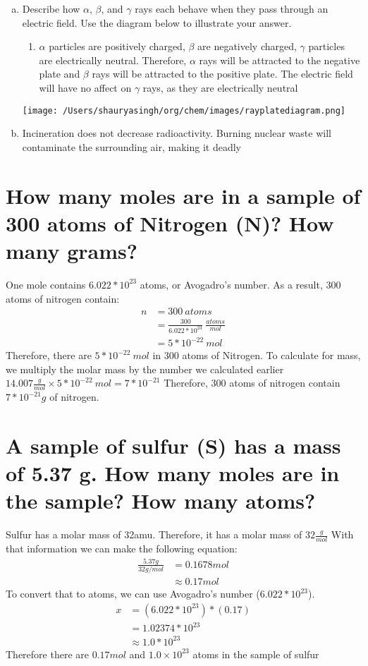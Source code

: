 \documentclass[11pt]{article}
\begin{document}
\begin{enumerate}[(a)]
\item Describe how \(\alpha\), \(\beta\), and \(\gamma\) rays each behave when they pass through an
electric field. Use the diagram below to illustrate your answer.
\begin{enumerate}
\item \(\alpha\) particles are positively charged, \(\beta\) are negatively charged, \(\gamma\)
particles are electrically neutral. Therefore, \(\alpha\) rays will be
attracted to the negative plate and \(\beta\) rays will be attracted to the
positive plate. The electric field will have no affect on \(\gamma\) rays, as
they are electrically neutral
\end{enumerate}
\begin{center}
\texttt{[image: /Users/shauryasingh/org/chem/images/rayplatediagram.png]}
\end{center}

\item Incineration does not decrease radioactivity. Burning nuclear waste will
contaminate the surrounding air, making it deadly
\end{enumerate}

\section{How many moles are in a sample of 300 atoms of Nitrogen (N)? How many grams?}
\label{sec:org99de753}
One mole contains \(6.022 *10^{23}\) atoms, or Avogadro's number. As a result, 300 atoms of nitrogen contain:
\begin{align*}
n&=300\ atoms\\
&=\frac{300}{6.022*10^{23}}\ \frac{atoms}{mol}\\
&=5*10^{-22}\ mol
\end{align*}
Therefore, there are \(5*10^{-22}\ mol\) in 300 atoms of Nitrogen. To calculate
for mass, we multiply the molar mass by the number we calculated earlier
\(14.007 \frac{g}{mol}\times5*10^{-22}\ mol=7*10^{-21}\)
Therefore, 300 atoms of nitrogen contain \(7*10^{-21}g\) of nitrogen.

\section{A sample of sulfur (S) has a mass of 5.37 g. How many moles are in the sample? How many atoms?}
\label{sec:org65d995b}
Sulfur has a molar mass of 32amu. Therefore, it has a molar mass of
\(32\frac{g}{mol}\)
With that information we can make the following equation:
\begin{align*}
\frac{5.37g}{32g/mol}&=0.1678mol\\
&\approx0.17mol
\end{align*}
To convert that to atoms, we can use Avogadro's number (\(6.022 *10^{23}\)).
\begin{align*}
x&=(6.022*10^{23})*(0.17)\\
&=1.02374*10^{23}\\
&\approx1.0*10^{23}
\end{align*}
Therefore there are \(0.17mol\) and \(1.0\times10^{23}\) atoms in the sample of sulfur
\end{document}
